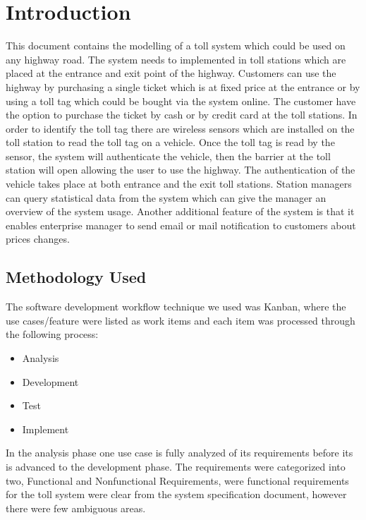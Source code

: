\chapter{Introduction}
\noindent
This document contains the modelling of a toll system which could be used on any highway road. The system needs to implemented in toll stations which are placed at the entrance and exit point of the highway. Customers can use the highway by purchasing a single ticket which is at fixed price at the entrance or by using a toll tag which could be bought via the system online. The customer have the option to purchase the ticket by cash or by credit card at the toll stations. In order to identify the toll tag there are wireless sensors which are installed on the toll station to read the toll tag on a vehicle. Once the toll tag is read by the sensor, the system will authenticate the vehicle, then the barrier at the toll station will open allowing the user to use the highway. The authentication of the vehicle takes place at both entrance and the exit toll stations. Station managers can query statistical data from the system which can give the manager an overview of the system usage. Another additional feature of the system is that it enables enterprise manager to send email or mail notification to customers about prices changes.
\section{Methodology Used}

The software development workflow technique we used was Kanban, where the use cases/feature were listed as work items and each item was processed through the following process:

\begin{itemize}
  \item Analysis
  \item Development
  \item Test
  \item Implement
\end{itemize}


In the analysis phase one use case is fully analyzed of its requirements before its is advanced to the development phase. The requirements were categorized into two, Functional and Nonfunctional Requirements, were functional requirements for the toll system were clear from the system specification document, however there were few ambiguous areas. 

